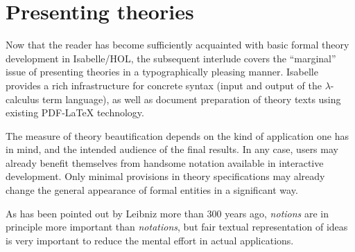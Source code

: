 
\chapter{Presenting theories}
\label{ch:thy-present}

Now that the reader has become sufficiently acquainted with basic formal
theory development in Isabelle/HOL, the subsequent interlude covers the
``marginal'' issue of presenting theories in a typographically pleasing
manner.  Isabelle provides a rich infrastructure for concrete syntax (input
and output of the $\lambda$-calculus term language), as well as document
preparation of theory texts using existing PDF-{\LaTeX} technology.

The measure of theory beautification depends on the kind of application one
has in mind, and the intended audience of the final results.  In any case,
users may already benefit themselves from handsome notation available in
interactive development.  Only minimal provisions in theory specifications may
already change the general appearance of formal entities in a significant way.

As has been pointed out by Leibniz more than
300 years ago, \emph{notions} are in principle more important than
\emph{notations}, but fair textual representation of ideas is very important
to reduce the mental effort in actual applications.



